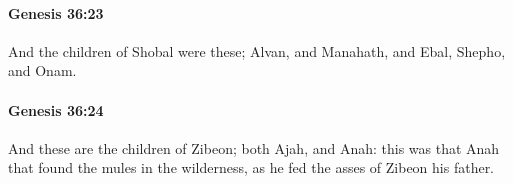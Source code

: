 		\paragraph{Genesis 36:23} %
			\label{GENESIS-36-23}

			And the children of Shobal were these; Alvan, and Manahath, and Ebal, Shepho, and Onam.


		\paragraph{Genesis 36:24} %
			\label{GENESIS-36-24}

			And these are the children of Zibeon; both Ajah, and Anah: this was that Anah that found the mules in the wilderness, as he fed the asses of Zibeon his father.


